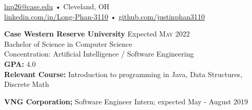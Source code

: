 \documentclass[a4paper,11pt]{article}
\begin{document}
 
 
\begin{center} 
\href{mailto:lnp26@case.edu}{lnp26@case.edu} • Cleveland, OH \\
\href{https://linkedin.com/in/Long-Phan-3110/}{linkedin.com/in/Long-Phan-3110} • \href{http://github.com/justinphan3110}{github.com/justinphan3110}
\noindent\makebox[\linewidth]{\rule{\paperwidth}{2pt}}
\end{center}

\begin{flushleft}
	\textbf{Case Western Reserve University } \hspace{1cm} Expected \textsc{May} 2022 \\
	Bachelor of Science in Computer Science \\
	Concentration: Artificial Intelligence / Software Engineering \\
	\textbf{\textsc{GPA:}} 4.0 \\ 
	\textbf{Relevant Course:} Introduction to programming in Java, Data Structures, Discrete Math \\
	\centering{\noindent\makebox{\rule{8cm}{1.5pt}}}
\end{flushleft}

\begin{flushleft}
	\textbf{VNG Corporation; } Software Engineer Intern; expected May - August 2019 \\
	\centering{\noindent\makebox{\rule{8cm}{1.5pt}}}
\end{flushleft} 
\end{document}
